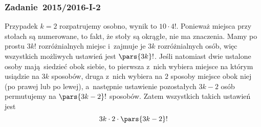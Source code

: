 \subsubsection*{Zadanie~2015/2016-I-2}
Przypadek \(k = 2\) rozpatrujemy osobno, wynik to \(10 \cdot 4!\). Ponieważ miejsca przy stołach są numerowane, to fakt, że stoły są okrągłe, nie ma znaczenia. Mamy po prostu \(3k!\) rozróżnialnych miejsc i~zajmuje je \(3k\) rozróżnialnych osób, więc wszystkich możliwych ustawień jest \(\pars{3k}!\). Jeśli natomiast dwie ustalone osoby mają siedzieć obok siebie, to pierwsza z~nich wybiera miejsce na którym usiądzie na \(3k\) sposobów, druga z~nich wybiera na \(2\) sposoby miejsce obok niej (po prawej lub po lewej), a~następnie ustawienie pozostałych \(3k - 2\) osób permutujemy na \(\pars{3k - 2}!\) sposobów. Zatem wszystkich takich ustawień jest
\begin{equation*}
    3k \cdot 2 \cdot \pars{3k - 2}!
\end{equation*}
